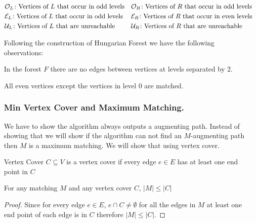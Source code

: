 \documentclass[twoside]{article}
\begin{document}
\begin{align*}
	&\mathcal{O}_L\colon\text{Vertices of $L$ that occur in odd levels}&& \mathcal{O}_R\colon\text{Vertices of $R$ that occur in odd levels}\\
	&\mathcal{E}_L\colon\text{Vertices of $L$ that occur in odd levels}&& \mathcal{E}_R\colon\text{Vertices of $R$ that occur in even levels}\\
	&\mathcal{U}_L\colon\text{Vertices of $L$ that are unreachable}&& \mathcal{U}_R\colon\text{Vertices of $R$ that are unreachable}
\end{align*}


Following the construction of Hungarian Forest we have the following observations:

\begin{observation}
	In the forest $F$ there are no edges between vertices at levels separated by 2. 
\end{observation}
\begin{observation}\label{evens-matched}
	All even vertices except the vertices in level 0 are matched.
\end{observation}

\subsubsection{Min Vertex Cover and Maximum Matching.}
We have to  show the algorithm always outputs a augmenting path. Instead of showing that we will show if the algorithm can not find an $M$-augmenting path then $M$ is a maximum matching. We will show that using vertex cover.

\begin{Definition}{Vertex Cover}{}
	$C\subseteq V$ is a vertex cover if every edge $e\in E$ has at least one end point in $C$
\end{Definition}
\begin{lemma}{}{}
	For any matching $M$ and any vertex cover $C$, $|M|\leq |C|$
\end{lemma}
\begin{proof}
	Since for every edge $e\in E$, $e\cap C\neq \emptyset$ for all the edges in $M$ at least one end point of each edge is in $C$ therefore $|M|\leq |C|$.
\end{proof}
\end{document}
